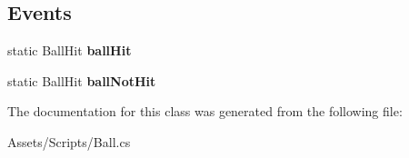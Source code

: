 \subsection*{Events}
\begin{DoxyCompactItemize}
\item 
static Ball\+Hit {\bfseries ball\+Hit}\hypertarget{class_ball_a58700e28710627524386272459258a2d}{}\label{class_ball_a58700e28710627524386272459258a2d}

\item 
static Ball\+Hit {\bfseries ball\+Not\+Hit}\hypertarget{class_ball_a7761d1549a457fcbba713ea70d17afb8}{}\label{class_ball_a7761d1549a457fcbba713ea70d17afb8}

\end{DoxyCompactItemize}


The documentation for this class was generated from the following file\+:\begin{DoxyCompactItemize}
\item 
Assets/\+Scripts/Ball.\+cs\end{DoxyCompactItemize}
